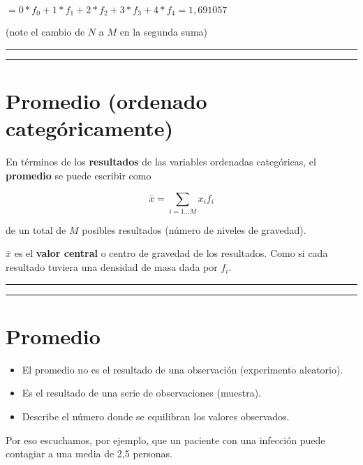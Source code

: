 \documentclass[
]{book}
\begin{document}
\(=0*f_{0}+1*f_{1}+2*f_{2}+3*f_{3}+4*f_{4}=1,691057\)

(note el cambio de \(N\) a \(M\) en la segunda suma)

\begin{center}\rule{0.5\linewidth}{0.5pt}\end{center}

\begin{center}\rule{0.5\linewidth}{0.5pt}\end{center}

\hypertarget{promedio-ordenado-categuxf3ricamente-1}{%
\section{Promedio (ordenado categóricamente)}\label{promedio-ordenado-categuxf3ricamente-1}}

En términos de los \textbf{resultados} de las variables ordenadas categóricas, el \textbf{promedio} se puede escribir como

\[\bar{x}= \sum_{i = 1...M} x_i f_i\]

de un total de \(M\) posibles resultados (número de niveles de gravedad).

\(\bar{x}\) es el \textbf{valor central} o centro de gravedad de los resultados. Como si cada resultado tuviera una densidad de masa dada por \(f_i\).

\begin{center}\rule{0.5\linewidth}{0.5pt}\end{center}

\begin{center}\rule{0.5\linewidth}{0.5pt}\end{center}

\hypertarget{promedio-1}{%
\section{Promedio}\label{promedio-1}}

\begin{itemize}
\item
  El promedio no es el resultado de una observación (experimento aleatorio).
\item
  Es el resultado de una serie de observaciones (muestra).
\item
  Describe el número donde se equilibran los valores observados.
\end{itemize}

Por eso escuchamos, por ejemplo, que un paciente con una infección puede contagiar a una media de 2,5 personas.
\end{document}
